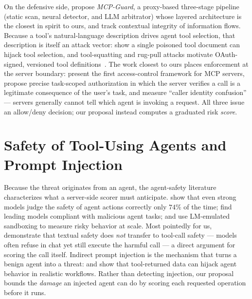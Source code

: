 On the defensive side, \citet{xing2025mcpguard} propose \emph{MCP-Guard}, a
proxy-based three-stage pipeline (static scan, neural detector, and LLM
arbitrator) whose layered architecture is the closest in spirit to ours, and
\citet{jing2025mcip} track contextual integrity of information flows. Because a
tool's natural-language description drives agent tool selection, that
description is itself an attack vector: \citet{shi2025toolhijacker} show a single
poisoned tool document can hijack tool selection, and tool-squatting and
rug-pull attacks motivate OAuth-signed, versioned tool
definitions~\cite{bhatt2025etdi}. The work closest to ours places enforcement at
the server boundary: \citet{buhler2026agentbound} present the first
access-control framework for MCP servers, \citet{sharma2026pauth} propose precise
task-scoped authorization in which the server verifies a call is a legitimate
consequence of the user's task, and \citet{huang2026caller} measure ``caller
identity confusion'' --- servers generally cannot tell which agent is invoking a
request. All three issue an allow/deny decision; our proposal instead computes a
graduated risk \emph{score}.

\section{Safety of Tool-Using Agents and Prompt Injection}
\label{sec:related_work:agent_safety}

Because the threat originates from an agent, the agent-safety literature
characterizes what a server-side scorer must anticipate.
\citet{yuan2024rjudge} show that even strong models judge the safety of agent
actions correctly only $74\%$ of the time; \citet{andriushchenko2025agentharm}
find leading models compliant with malicious agent tasks; and
\citet{ruan2024toolemu} use LM-emulated sandboxing to measure risky behavior at
scale. Most pointedly for us, \citet{cartagena2026gap} demonstrate that textual
safety does \emph{not} transfer to tool-call safety --- models often refuse in
chat yet still execute the harmful call --- a direct argument for scoring the
call itself. Indirect prompt injection is the mechanism that turns a benign
agent into a threat: \citet{zhan2024injecagent} and \citet{debenedetti2024agentdojo}
show that tool-returned data can hijack agent behavior in realistic workflows.
Rather than detecting injection, our proposal bounds the \emph{damage} an
injected agent can do by scoring each requested operation before it runs.

